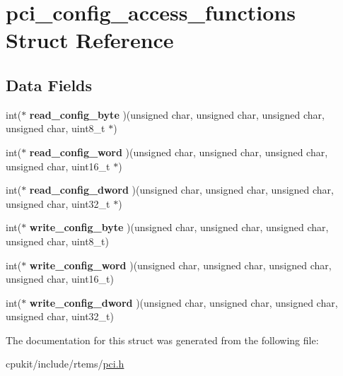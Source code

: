 \hypertarget{structpci__config__access__functions}{}\section{pci\+\_\+config\+\_\+access\+\_\+functions Struct Reference}
\label{structpci__config__access__functions}
\subsection*{Data Fields}
\begin{DoxyCompactItemize}
\item 
\mbox{\label{structpci__config__access__functions_a9d34301da52eae00765046ee25fe9dc0}} 
int($\ast$ {\bfseries read\+\_\+config\+\_\+byte} )(unsigned char, unsigned char, unsigned char, unsigned char, uint8\+\_\+t $\ast$)
\item 
\mbox{\label{structpci__config__access__functions_a3ec8bec217e24d4814ab232f111338d7}} 
int($\ast$ {\bfseries read\+\_\+config\+\_\+word} )(unsigned char, unsigned char, unsigned char, unsigned char, uint16\+\_\+t $\ast$)
\item 
\mbox{\label{structpci__config__access__functions_a91146ec9a9e92baee50677d53337aa5b}} 
int($\ast$ {\bfseries read\+\_\+config\+\_\+dword} )(unsigned char, unsigned char, unsigned char, unsigned char, uint32\+\_\+t $\ast$)
\item 
\mbox{\label{structpci__config__access__functions_a308e35a7e343ac070dc00eff70493cfb}} 
int($\ast$ {\bfseries write\+\_\+config\+\_\+byte} )(unsigned char, unsigned char, unsigned char, unsigned char, uint8\+\_\+t)
\item 
\mbox{\label{structpci__config__access__functions_a75f748126519afb3d7676ae20858f89f}} 
int($\ast$ {\bfseries write\+\_\+config\+\_\+word} )(unsigned char, unsigned char, unsigned char, unsigned char, uint16\+\_\+t)
\item 
\mbox{\label{structpci__config__access__functions_a6d2147127d485a7cea04f69acf959514}} 
int($\ast$ {\bfseries write\+\_\+config\+\_\+dword} )(unsigned char, unsigned char, unsigned char, unsigned char, uint32\+\_\+t)
\end{DoxyCompactItemize}


The documentation for this struct was generated from the following file\+:\begin{DoxyCompactItemize}
\item 
cpukit/include/rtems/\mbox{\hyperlink{cpukit_2include_2rtems_2pci_8h}{pci.\+h}}\end{DoxyCompactItemize}
